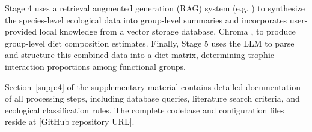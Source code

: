 Stage 4 uses a retrieval augmented generation (RAG) system (e.g. \citep{keck2025extracting}) to synthesize the species-level ecological data into group-level summaries and incorporates user-provided local knowledge from a vector storage database, Chroma \citep{Chroma2024}, to produce group-level diet composition estimates. Finally, Stage 5 uses the LLM to parse and structure this combined data into a diet matrix, determining trophic interaction proportions among functional groups.

Section~\ref{supp:4} of the supplementary material contains detailed documentation of all processing steps, including database queries, literature search criteria, and ecological classification rules. The complete codebase and configuration files reside at [GitHub repository URL].
